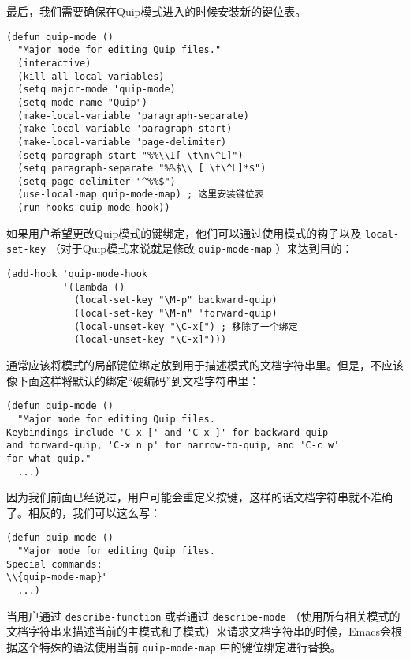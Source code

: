 最后，我们需要确保在Quip模式进入的时候安装新的键位表。

\begin{verbatim}
(defun quip-mode ()
  "Major mode for editing Quip files."
  (interactive)
  (kill-all-local-variables)
  (setq major-mode 'quip-mode)
  (setq mode-name "Quip")
  (make-local-variable 'paragraph-separate)
  (make-local-variable 'paragraph-start)
  (make-local-variable 'page-delimiter)
  (setq paragraph-start "%%\\I[ \t\n\^L]")
  (setq paragraph-separate "%%$\\ [ \t\^L]*$")
  (setq page-delimiter "^%%$")
  (use-local-map quip-mode-map) ; 这里安装键位表
  (run-hooks quip-mode-hook))
\end{verbatim}

如果用户希望更改Quip模式的键绑定，他们可以通过使用模式的钩子以及 \texttt{local-set-key} （对于Quip模式来说就是修改 \texttt{quip-mode-map} ）来达到目的：

\begin{verbatim}
(add-hook 'quip-mode-hook
          '(lambda ()
            (local-set-key "\M-p" backward-quip)
            (local-set-key "\M-n" 'forward-quip)
            (local-unset-key "\C-x[") ; 移除了一个绑定
            (local-unset-key "\C-x]")))
\end{verbatim}

通常应该将模式的局部键位绑定放到用于描述模式的文档字符串里。但是，不应该像下面这样将默认的绑定“硬编码”到文档字符串里：

\begin{verbatim}
(defun quip-mode ()
  "Major mode for editing Quip files.
Keybindings include 'C-x [' and 'C-x ]' for backward-quip
and forward-quip, 'C-x n p' for narrow-to-quip, and 'C-c w'
for what-quip."
  ...)
\end{verbatim}

因为我们前面已经说过，用户可能会重定义按键，这样的话文档字符串就不准确了。相反的，我们可以这么写：

\begin{verbatim}
(defun quip-mode ()
  "Major mode for editing Quip files.
Special commands:
\\{quip-mode-map}"
  ...)
\end{verbatim}

当用户通过 \texttt{describe-function} 或者通过 \texttt{describe-mode} （使用所有相关模式的文档字符串来描述当前的主模式和子模式）来请求文档字符串的时候，Emacs会根据这个特殊的语法使用当前 \texttt{quip-mode-map} 中的键位绑定进行替换。

